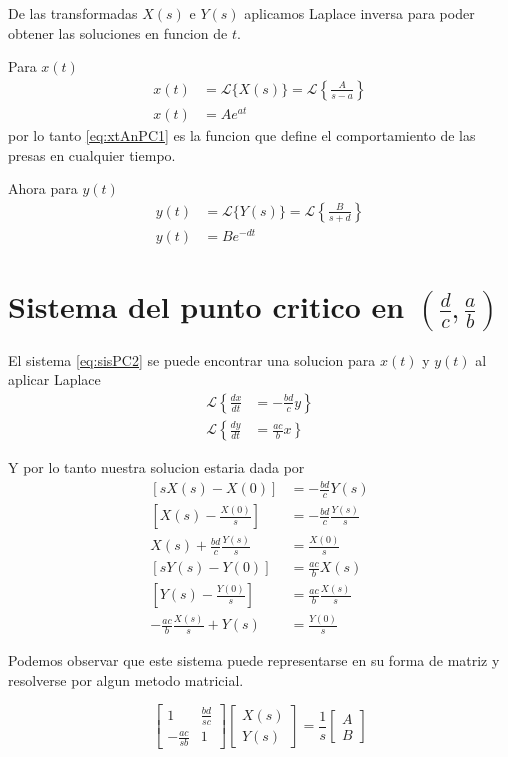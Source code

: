 \documentclass{report}
\begin{document}
De las transformadas $X(s)$ e $Y(s)$ aplicamos Laplace inversa para poder obtener las soluciones en funcion de $t$.

Para $x(t)$
\begin{align}
x(t)&=\mathcal{L}\{X(s)\} =\mathcal{L}\left\{ \frac{A}{s-a}
\right\}\nonumber\\
x(t)&=Ae^{at} \label{eq:xtAnPC1}
\end{align}
por lo tanto \ref{eq:xtAnPC1} es la funcion que define el comportamiento de las presas en cualquier tiempo.

Ahora para $y(t)$
\begin{align}
y(t)&=\mathcal{L}\{Y(s)\} =\mathcal{L}\left\{ \frac{B}{s+d}
\right\}\nonumber\\
y(t)&=Be^{-dt}
\end{align}

\section{Sistema del punto critico en $(\frac{d}{c},\frac{a}{b})$}
El sistema \ref{eq:sisPC2} se puede encontrar una solucion para $x(t)$ y $y(t)$ al aplicar Laplace 
\begin{align*}
\mathcal{L}\left\{ \frac{dx}{dt}\right.
&=\left. -\frac{bd}{c}y  \right\}
\\
\mathcal{L}\left\{ \frac{dy}{dt}\right.
&= \left.\frac{ac}{b}x  \right\}
\end{align*}

Y por lo tanto nuestra solucion estaria dada por
\begin{subequations}
\begin{align}
[sX(s)-X(0)]&=-\frac{bd}{c}Y(s) \nonumber \\
[X(s)-\frac{X(0)}{s}]&=-\frac{bd}{c}\frac{Y(s)}{s} \nonumber\\
X(s)+\frac{bd}{c}\frac{Y(s)}{s}&=\frac{X(0)}{s} \label{eq:lapXs} \\
[sY(s)-Y(0)]&=\frac{ac}{b}X(s) \nonumber \\
[Y(s)-\frac{Y(0)}{s}]&=\frac{ac}{b}\frac{X(s)}{s} \nonumber \\
-\frac{ac}{b}\frac{X(s)}{s}+Y(s)&=\frac{Y(0)}{s} \label{eq:lapYs}
\end{align}
\end{subequations}

Podemos observar que este sistema puede representarse en su forma de matriz y resolverse por algun metodo matricial.

\begin{equation}
\left[\begin{matrix}
1 &\frac{bd}{sc} \\
-\frac{ac}{sb} &1
\end{matrix}\right]
\left[\begin{array}{c}
X(s)\\
Y(s)
\end{array}\right]
=
\frac{1}{s}\left[\begin{array}{c}
A\\
B
\end{array}\right]\label{eq:sistemAnLaplace}
\end{equation}
\end{document}
